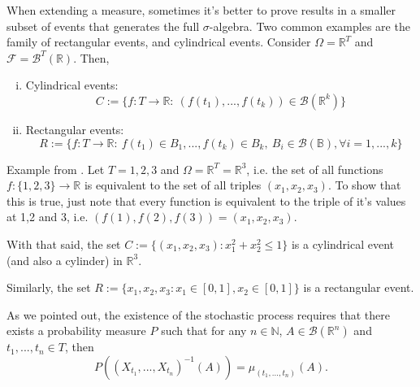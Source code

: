 \begin{definition}
	When extending a measure, sometimes it's better to prove results
	in a smaller subset of events that generates the full $\sigma$-algebra.
	Two common examples are the family of rectangular events, and cylindrical events.
	Consider $\Omega = \mathbb R^T$ and $\mathcal F = \mathcal B^T(\mathbb R)$. Then,
	\begin{enumerate}[(i)]
		\item Cylindrical events:
		      \begin{displaymath}
			      C := \{f:T \to \mathbb R : \ (f(t_1),...,f(t_k)) \in \mathcal B(\mathbb R^k) \}
		      \end{displaymath}
		\item Rectangular events:
		      \begin{displaymath}
			      R := \{f:T \to \mathbb R : \ f(t_1) \in B_1, ..., f(t_k) \in B_k, \ B_i \in \mathcal B(\mathbb B), \forall i =1,...,k\}
		      \end{displaymath}
	\end{enumerate}
\end{definition}

\begin{example}
	Example from \citet{athreya2006measure}.
	Let $T = {1,2,3}$ and $\Omega = \mathbb R^T = \mathbb R^3$, i.e.
	the set of all functions $f:\{1,2,3\} \to \mathbb R$ is equivalent to the set of all triples $(x_1,x_2,x_3)$.
	To show that this is true, just note that every function is equivalent to the triple of it's
	values at 1,2 and 3, i.e. $(f(1), f(2), f(3)) = (x_1,x_2,x_3)$.

	With that said, the set $C:= \{(x_1,x_2,x_3) : x_1^2 + x_2^2 \leq 1 \}$ is a cylindrical
	event (and also a cylinder) in $\mathbb R^3$.

	Similarly, the set $R:=\{x_1,x_2,x_3 : x_1 \in [0,1], x_2 \in [0,1]\}$ is a rectangular event.
\end{example}

As we pointed out, the existence of the stochastic process requires
that there exists a probability measure $P$ such that
for any $n \in \mathbb N$, $A\in \mathcal B(\mathbb R^n)$ and $t_1,...,t_n \in T$, then
\begin{equation}
	P((X_{t_1},...,X_{t_n})^{-1}(A)) = \mu_{(t_1,...,t_n)}(A).
	\label{eq:fidimatch}
\end{equation}

